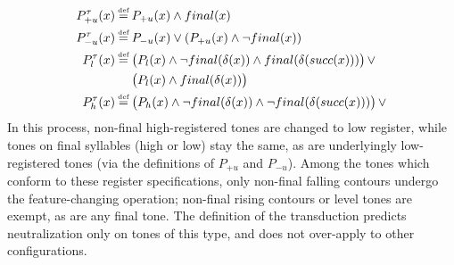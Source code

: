 \documentclass{article}
\newcommand\myeq{\mathrel{\stackrel{\makebox[0pt]{\mbox{\normalfont\tiny def}}}{=}}}
\begin{document}
\begin{equation}
\begin{aligned}
P^{\tau}_{+u}(x)&\myeq P_{+u}(x)\land final(x)  \\
P^{\tau}_{-u}(x)&\myeq P_{-u}(x) \lor (P_{+u}(x)\land \neg final(x)) \\
P^{\tau}_{l}(x)&\myeq \big(P_{l}(x)\land \neg final(\delta(x))\land final(\delta(succ(x)))\big)\,\lor \\
&\quad\,\,\big(P_{l}(x)\land final(\delta(x))\big) \\
P^{\tau}_{h}(x)&\myeq \big(P_{h}(x)\land\neg final(\delta(x))\land\neg final(\delta(succ(x)))\big)\,\lor \\
\end{aligned}
\end{equation}
In this process, non-final high-registered tones are changed to low register, while tones on final syllables (high or low) stay the same, as are underlyingly low-registered tones (via the definitions of $P_{+u}$ and $P_{-u}$). Among the tones which conform to these register specifications, only non-final falling contours undergo the feature-changing operation; non-final rising contours or level tones are exempt, as are any final tone. The definition of the transduction predicts neutralization only on tones of this type, and does not over-apply to other configurations.
\end{document}
